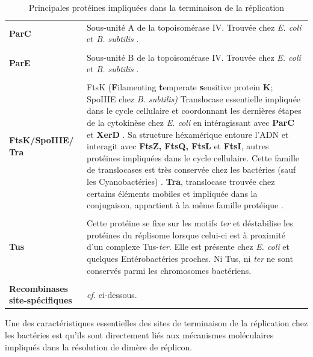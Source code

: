 \begin{longtable}{@{\hspace{-2cm}\hspace{1cm}} >{\bfseries}p{} | >{\small}p{}}
	\caption{Principales protéines impliquées dans la terminaison de la réplication} \label{tabrepelong} \\
	\endfirsthead
	ParC & Sous-unité A de la topoisomérase IV. Trouvée chez \textit{E. coli} et \textit{B. subtilis} \citep{barnes2003dna}.\\
	\\[-0.2cm]
	ParE & Sous-unité B de la topoisomérase IV. Trouvée chez \textit{E. coli} et \textit{B. subtilis} \citep{barnes2003dna}.\\
	\\[-0.2cm]
	FtsK/SpoIIIE/ Tra & FtsK (\textbf{F}ilamenting \textbf{t}emperate \textbf{s}ensitive protein \textbf{K}; SpoIIIE chez \textit{B. subtilis)} Translocase essentielle impliquée dans le cycle cellulaire et coordonnant les dernières étapes de la cytokinèse chez \textit{E. coli} \citep{graham2010ftsk} en intéragissant avec \textbf{ParC} et \textbf{XerD} \citep{barre2000ftsk}. Sa structure héxamérique entoure l'ADN et interagit avec \textbf{FtsZ, FtsQ, FtsL} et \textbf{FtsI}, autres protéines impliquées dans le cycle cellulaire. Cette famille de translocases est très conservée chez les bactéries (sauf les Cyanobactéries) \citep{bigot2007ftsk}. \textbf{Tra}, translocase trouvée chez certains éléments mobiles et impliquée dans la conjugaison, appartient à la même famille protéique \citep{bigot2007ftsk}.\\
	\\[-0.2cm]
	Tus & Cette protéine se fixe sur les motifs \textit{ter} et déstabilise les protéines du réplisome lorsque celui-ci est à proximité d'un complexe Tus-\textit{ter}. Elle est présente chez \textit{E. coli} et quelques Entérobactéries proches. Ni Tus, ni \textit{ter} ne sont conservés parmi les chromosomes bactériens.\\
	\\[-0.2cm]
	\mbox{Recombinases} \mbox{site-spécifiques} & \textit{cf.} ci-dessous.
\end{longtable}

Une des caractéristiques essentielles des sites de terminaison de la réplication chez les bactéries est qu'ils sont directement liés aux mécanismes moléculaires impliqués dans la résolution de dimère de réplicon.

 
